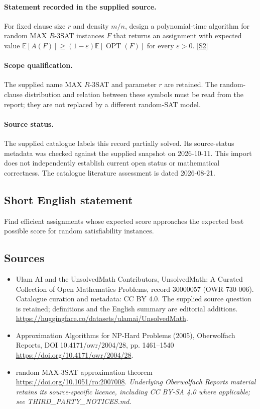 \documentclass[11pt]{article}
\begin{document}
\paragraph{Statement recorded in the supplied source.}
For fixed clause size $r$ and density $m/n$, design a polynomial-time algorithm for random MAX $R$-3SAT instances $F$ that returns an assignment with expected value $\mathbb{E}[A(F)]\geq(1-\varepsilon)\mathbb{E}[\operatorname{OPT}(F)]$ for every $\varepsilon>0$. \href{https://doi.org/10.4171/owr/2004/28}{[S2]}
\paragraph{Scope qualification.}
The supplied name MAX $R$-3SAT and parameter $r$ are retained. The random-clause distribution and relation between these symbols must be read from the report; they are not replaced by a different random-SAT model.
\paragraph{Source status.}
The supplied catalogue labels this record partially solved. Its source-status metadata was checked against the supplied snapshot on 2026-10-11. This import does not independently establish current open status or mathematical correctness. The catalogue literature assessment is dated 2026-08-21.
\subsection{Short English statement}
Find efficient assignments whose expected score approaches the expected best possible score for random satisfiability instances.
\subsection{Sources}
\begin{itemize}
\item[S1] Ulam AI and the UnsolvedMath Contributors, UnsolvedMath: A Curated Collection of Open Mathematics Problems, record 30000057 (OWR-730-006). Catalogue curation and metadata: CC BY 4.0. The supplied source question is retained; definitions and the English summary are editorial additions.
\url{https://huggingface.co/datasets/ulamai/UnsolvedMath}.
\item[S2] Approximation Algorithms for NP-Hard Problems (2005), Oberwolfach Reports, DOI 10.4171/owr/2004/28, pp. 1461--1540
\url{https://doi.org/10.4171/owr/2004/28}.
\item[S3] random MAX-3SAT approximation theorem
\url{https://doi.org/10.1051/ro:2007008}.
\textit{Underlying Oberwolfach Reports material retains its source-specific licence, including CC BY-SA 4.0 where applicable; see THIRD\_PARTY\_NOTICES.md.}
\end{itemize}
\end{document}
